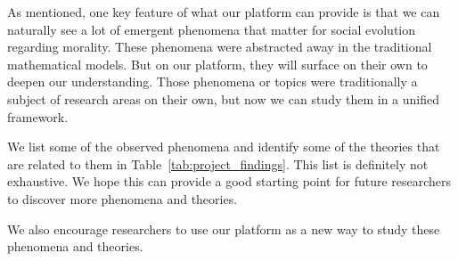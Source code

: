 As mentioned, one key feature of what our platform can provide is that we can naturally see a lot of emergent phenomena that matter for social evolution regarding morality. These phenomena were abstracted away in the traditional mathematical models. But on our platform, they will surface on their own to deepen our understanding. Those phenomena or topics were traditionally a subject of research areas on their own, but now we can study them in a unified framework. 

We list some of the observed phenomena and identify some of the theories that are related to them in Table~\ref{tab:project_findings}. This list is definitely not exhaustive. We hope this can provide a good starting point for future researchers to discover more phenomena and theories.

We also encourage researchers to use our platform as a new way to study these phenomena and theories.


